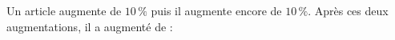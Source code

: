 
Un article augmente de $10\,\%$ puis il augmente encore de $10\,\%$. Après ces deux augmentations, il a augmenté de :

\smallskip

